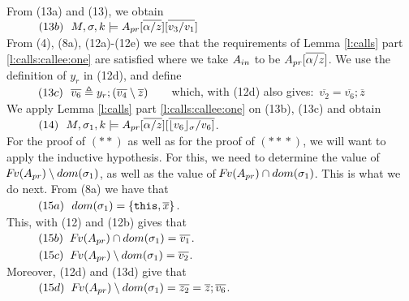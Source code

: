 \begin{description}
From (13a) and (13), we obtain
\\
$\strut \ \ \hspace{0.5cm} \ \  (13b) \ \     M,\sigma ,{k} \models { A_{pr}[\overline{\alpha/z}]  [\overline{v_3/v_1}] } $
\\
From (4), (8a), (12a)-(12e)  we see that the requirements  %
 of Lemma \ref{l:calls}  part  \ref{l:calls:callee:one} are satisfied where we take  $A_{in}$ to be $A_{pr}[\overline{\alpha/z}]$.
 We use the definition of $y_r$ in (12d), and define\\
$\strut \ \ \hspace{0.5cm} \ \  (13c) \ \ \overline {v_6} \triangleq  y_r;  (\overline {v_4}\setminus \overline{z})$\ \ \ \ which, with (12d) also gives:\ $ \overline {v_2} = \overline{v_6}; \overline{z}$
\\
We apply   Lemma   \ref{l:calls} part \ref{l:calls:callee:one} on (13b), (13c)  and  obtain\\
$\strut \ \ \hspace{0.5cm} \ \  (14) \ \  M,\sigma_1 ,{k} \models {A_{pr}[\overline{\alpha/z}][\overline{\lfloor v_6 \rfloor_{\sigma}/v_6] }} $. \\

For the proof of $(**)$ as well as for the proof of $(*\!*\!*)$, we will want to apply the inductive hypothesis.   For this, we need to determine the value of  
${\hspace{-1pt}F\hspace{-1pt}}v(A_{pr})  \setminus dom(\sigma_1)$, as well as the value of ${\hspace{-1pt}F\hspace{-1pt}}v(A_{pr})  \cap dom(\sigma_1)$. 
  This is what we do next. From (8a) we have that\\
$\strut \ \ \hspace{0.5cm} \ \  (15a) \ \  dom(\sigma_1)=\{ \mbox{\normalfont{\texttt{this}}}, \overline x \}$.\\
This, with (12)  and (12b)  gives  that\\
$\strut \ \ \hspace{0.5cm} \ \  (15b) \ \ {\hspace{-1pt}F\hspace{-1pt}}v(A_{pr})\cap dom(\sigma_1)= \overline {v_1}$.\\
$\strut \ \ \hspace{0.5cm} \ \  (15c) \ \  {\hspace{-1pt}F\hspace{-1pt}}v(A_{pr})  \setminus dom(\sigma_1) = \overline {v_2}$. \\
Moreover, (12d) and (13d) give that\\
$\strut \ \ \hspace{0.5cm} \ \  (15d) \ \  {\hspace{-1pt}F\hspace{-1pt}}v(A_{pr})  \setminus dom(\sigma_1) = \overline{z_2} = \overline {z}; \overline{v_6}$.



\end{description}
